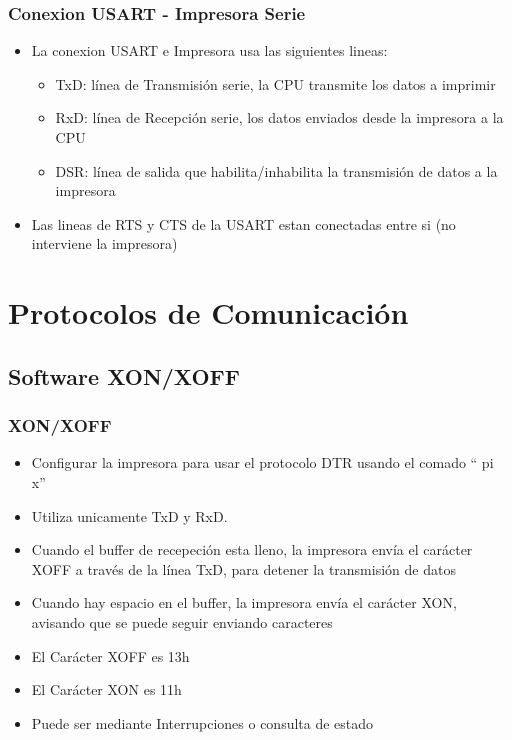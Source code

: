 \documentclass{beamer}
\begin{document}
\begin{frame}[fragile]
\frametitle{Conexion USART - Impresora Serie}
\begin{itemize}
 \item La conexion USART e Impresora usa las siguientes lineas:
 \begin{itemize}
  \item TxD: línea de Transmisión serie, la CPU transmite los datos a imprimir
  \item RxD: línea de Recepción serie, los datos enviados desde la impresora a la CPU
  \item DSR: línea de salida que habilita/inhabilita la transmisión de datos a la impresora
\end{itemize}
\item Las lineas de RTS y CTS de la USART estan conectadas entre si (no interviene la impresora)
\end{itemize}
\end{frame}

\section{Protocolos de Comunicación}
\subsection{Software XON/XOFF}
\begin{frame}[fragile]
\frametitle{XON/XOFF}
\begin{itemize}
 \item Configurar la impresora para usar el protocolo DTR usando el comado `` pi x''
 \item Utiliza unicamente TxD y RxD.
 \item Cuando el buffer de recepeción esta lleno, la impresora envía el carácter XOFF a través de la línea TxD, para detener la transmisión de datos
 \item Cuando hay espacio en el buffer, la impresora envía el carácter XON, avisando que se puede seguir enviando caracteres
 \item El Carácter XOFF es 13h
 \item El Carácter XON es 11h
 \item Puede ser mediante Interrupciones o consulta de estado
\end{itemize}

\end{frame}
\end{document}
